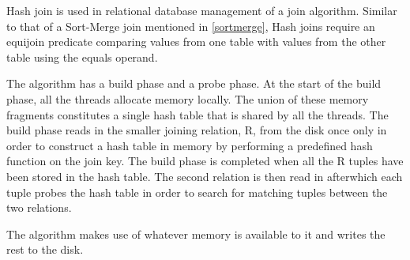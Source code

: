 \documentclass[10pt,twocolumn]{witseiepaper}
\begin{document}
Hash join is used in relational database management of a join algorithm. Similar to that of a Sort-Merge join mentioned in \ref{sortmerge}, Hash joins require an equijoin predicate comparing values from one table with values from the other table using the equals operand.

The algorithm has a build phase and a probe phase. At the start of the build phase, all the threads allocate memory locally. The union of these memory fragments constitutes a single hash table that is shared by all the threads. The build phase reads in the smaller joining relation, R, from the disk once only in order to construct a hash table in memory  by performing a predefined hash function on the join key. The build phase is completed when all the R tuples have been stored in the hash table. The second relation is then read in afterwhich each tuple probes the hash table in order to search for matching tuples between the two relations.

The algorithm makes use of whatever memory is available to it and writes the rest to the disk.

\end{document}
